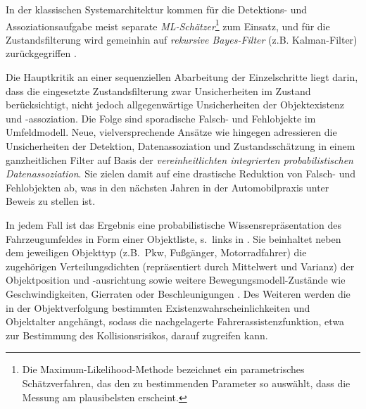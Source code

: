In der klassischen Systemarchitektur kommen für die Detektions- und Assoziationsaufgabe meist separate \emph{ML-Schätzer}\footnote{Die Maximum-Likelihood-Methode bezeichnet ein parametrisches Schätzverfahren, das den zu bestimmenden Parameter so auswählt, dass die Messung am plausibelsten erscheint.} zum Einsatz, und für die Zustandsfilterung wird gemeinhin auf \emph{rekursive Bayes-Filter} (z.B. Kalman-Filter) zurückgegriffen \cite{Thrun2005}.

Die Hauptkritik an einer sequenziellen Abarbeitung der Einzelschritte liegt darin, dass die eingesetzte Zustandsfilterung zwar Unsicherheiten im Zustand berücksichtigt, nicht jedoch allgegenwärtige Unsicherheiten der Objektexistenz und -assoziation. Die Folge sind sporadische Falsch- und Fehlobjekte im Umfeldmodell.
Neue, vielversprechende Ansätze wie \cite{mahlisch2009filtersynthese} hingegen adressieren die Unsicherheiten der Detektion, Datenassoziation und Zustandsschätzung in einem ganzheitlichen Filter auf Basis der \emph{vereinheitlichten integrierten probabilistischen Datenassoziation}. Sie zielen damit auf eine drastische Reduktion von Falsch- und Fehlobjekten ab, was in den nächsten Jahren in der Automobilpraxis unter Beweis zu stellen ist.

In jedem Fall ist das Ergebnis eine probabilistische Wissensrepräsentation des Fahrzeugumfeldes in Form einer Objektliste, s.\ links in . Sie beinhaltet neben dem jeweiligen Objekttyp (z.B.\ Pkw, Fußgänger, Motorradfahrer) die zugehörigen Verteilungsdichten (repräsentiert durch Mittelwert und Varianz) der Objektposition und -ausrichtung sowie weitere Bewegungsmodell-Zustände wie Geschwindigkeiten, Gierraten oder Beschleunigungen \cite{li2003surveymodels}. Des Weiteren werden die in der Objektverfolgung bestimmten Existenzwahrscheinlichkeiten und Objektalter angehängt, sodass die nachgelagerte Fahrerassistenzfunktion, etwa zur Bestimmung des Kollisionsrisikos, darauf zugreifen kann.




